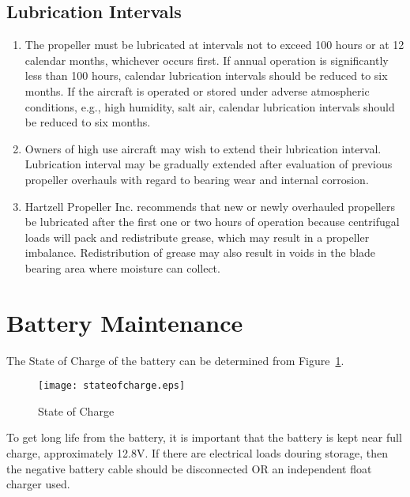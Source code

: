 \subsection{Lubrication Intervals}
\begin{enumerate}
\item 
The propeller must be lubricated at intervals not to 
exceed 100 hours or at 12 calendar months, whichever 
occurs first.
\subitem
If annual operation is significantly less than 100 
hours, calendar lubrication intervals should be 
reduced to six months.
\subitem
If the aircraft is operated or stored under adverse 
atmospheric conditions, e.g., high humidity, salt air, 
calendar lubrication intervals should be reduced to 
six months.
\item
Owners of high use aircraft may wish to extend their 
lubrication interval. Lubrication interval may be gradually 
extended after evaluation of previous propeller overhauls 
with regard to bearing wear and internal corrosion.
\item 
Hartzell Propeller Inc. recommends that new or newly 
overhauled propellers be lubricated after the first one or 
two hours of operation because centrifugal loads will pack 
and redistribute grease, which may result in a propeller 
imbalance. Redistribution of grease may also result in 
voids in the blade bearing area where moisture can collect.
\end{enumerate}

\section{Battery Maintenance}
The State of Charge of the battery can be determined from Figure~\ref{fig:SOC}.

\begin{figure}[H]
\centering
\texttt{[image: stateofcharge.eps]}
\caption{State of Charge}
\label{fig:SOC}
\end{figure}

To get long life from the battery, it is important that the battery is kept near full charge, approximately 12.8V.  If there are electrical loads douring storage, then the negative battery cable should be disconnected OR an independent float charger used.
